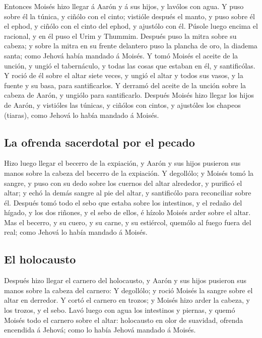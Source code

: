  Entonces Moisés hizo llegar á Aarón y á sus hijos, y
lavólos con agua.  Y puso sobre él la túnica, y ciñólo con
el cinto; vistióle después el manto, y puso sobre él el ephod, y ciñólo
con el cinto del ephod, y ajustólo con él.  Púsole luego
encima el racional, y en él puso el Urim y Thummim. 
Después puso la mitra sobre su cabeza; y sobre la mitra en su frente
delantero puso la plancha de oro, la diadema santa; como Jehová había
mandado á Moisés.  Y tomó Moisés el aceite de la unción,
y ungió el tabernáculo, y todas las cosas que estaban en él, y
santificólas.  Y roció de él sobre el altar siete veces,
y ungió el altar y todos sus vasos, y la fuente y su basa, para
santificarlos.  Y derramó del aceite de la unción sobre
la cabeza de Aarón, y ungiólo para santificarlo.  Después
Moisés hizo llegar los hijos de Aarón, y vistióles las túnicas, y
ciñólos con cintos, y ajustóles los chapeos (tiaras), como Jehová lo
había mandado á Moisés.

\hypertarget{la-ofrenda-sacerdotal-por-el-pecado}{%
\subsection{La ofrenda sacerdotal por el
pecado}\label{la-ofrenda-sacerdotal-por-el-pecado}}

 Hizo luego llegar el becerro de la expiación, y Aarón y
sus hijos pusieron sus manos sobre la cabeza del becerro de la
expiación.  Y degollólo; y Moisés tomó la sangre, y puso
con su dedo sobre los cuernos del altar alrededor, y purificó el altar;
y echó la demás sangre al pie del altar, y santificólo para reconciliar
sobre él.  Después tomó todo el sebo que estaba sobre los
intestinos, y el redaño del hígado, y los dos riñones, y el sebo de
ellos, é hízolo Moisés arder sobre el altar.  Mas el
becerro, y su cuero, y su carne, y su estiércol, quemólo al fuego fuera
del real; como Jehová lo había mandado á Moisés.

\hypertarget{el-holocausto}{%
\subsection{El holocausto}\label{el-holocausto}}

 Después hizo llegar el carnero del holocausto, y Aarón y
sus hijos pusieron sus manos sobre la cabeza del carnero:
 Y degollólo; y roció Moisés la sangre sobre el altar en
derredor.  Y cortó el carnero en trozos; y Moisés hizo
arder la cabeza, y los trozos, y el sebo.  Lavó luego con
agua los intestinos y piernas, y quemó Moisés todo el carnero sobre el
altar: holocausto en olor de suavidad, ofrenda encendida á Jehová; como
lo había Jehová mandado á Moisés.

